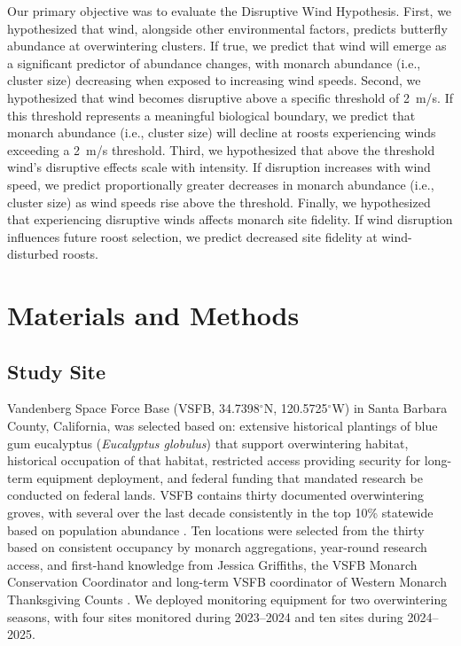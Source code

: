 \documentclass[insects,article,submit,pdftex,moreauthors]{Definitions/mdpi}
\begin{document}
Our primary objective was to evaluate the Disruptive Wind Hypothesis. First, we hypothesized that wind, alongside other environmental factors, predicts butterfly abundance at overwintering clusters. If true, we predict that wind will emerge as a significant predictor of abundance changes, with monarch abundance (i.e., cluster size) decreasing when exposed to increasing wind speeds. Second, we hypothesized that wind becomes disruptive above a specific threshold of 2~m/s. If this threshold represents a meaningful biological boundary, we predict that monarch abundance (i.e., cluster size) will decline at roosts experiencing winds exceeding a 2~m/s threshold. Third, we hypothesized that above the threshold wind's disruptive effects scale with intensity. If disruption increases with wind speed, we predict proportionally greater decreases in monarch abundance (i.e., cluster size) as wind speeds rise above the threshold. Finally, we hypothesized that experiencing disruptive winds affects monarch site fidelity. If wind disruption influences future roost selection, we predict decreased site fidelity at wind-disturbed roosts.


\section{Materials and Methods}

\subsection{Study Site}

Vandenberg Space Force Base (VSFB, 34.7398$^{\circ}$N, 120.5725$^{\circ}$W) in Santa Barbara County, California, was selected based on: extensive historical plantings of blue gum eucalyptus (\textit{Eucalyptus globulus}) that support overwintering habitat, historical occupation of that habitat, restricted access providing security for long-term equipment deployment, and federal funding that mandated research be conducted on federal lands. VSFB contains thirty documented overwintering groves, with several over the last decade consistently in the top 10\% statewide based on population abundance \cite{xercessocietyWesternMonarchThanksgiving2025}. Ten locations were selected from the thirty based on consistent occupancy by monarch aggregations, year-round research access, and first-hand knowledge from Jessica Griffiths, the VSFB Monarch Conservation Coordinator and long-term VSFB coordinator of Western Monarch Thanksgiving Counts \cite{xercessocietyWesternMonarchThanksgiving2025}. We deployed monitoring equipment for two overwintering seasons, with four sites monitored during 2023--2024 and ten sites during 2024--2025.
\end{document}
